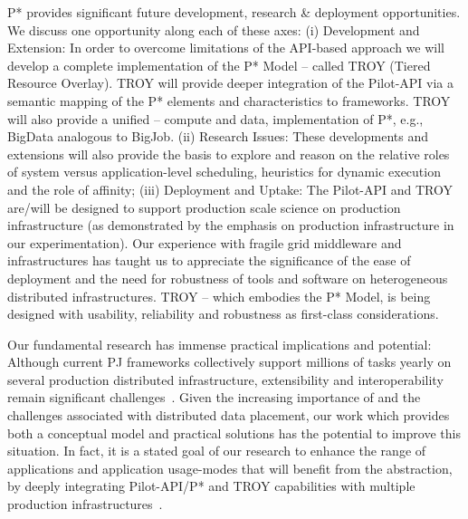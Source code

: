 \documentclass{sig-alternate}
\begin{document}

P* provides significant future development, research \& deployment
opportunities. We discuss one opportunity along each of these axes:
(i) Development and Extension: In order to overcome limitations of the
API-based approach we will develop a complete implementation of the P* Model
-- called TROY (Tiered Resource Overlay). TROY will provide deeper
integration of the Pilot-API via a semantic mapping of the P* elements
and characteristics to \pilotjob frameworks.  TROY will also provide a
unified -- compute and data, implementation of P*, e.g., BigData
analogous to BigJob.  (ii) Research Issues: These developments and
extensions will also provide the basis to explore and reason on the
relative roles of system versus application-level scheduling,
heuristics for dynamic execution and the role of affinity; (iii)
Deployment and Uptake: The Pilot-API and TROY are/will be designed to
support production scale science on production infrastructure (as
demonstrated by the emphasis on production infrastructure in our
experimentation).  Our experience with fragile grid middleware and
infrastructures has taught us to appreciate the significance of the
ease of deployment and the need for robustness of tools and software
on heterogeneous distributed infrastructures.  TROY -- which embodies
the P* Model, is being designed with usability, reliability and
robustness as first-class considerations.

Our fundamental research has immense practical implications and
potential: Although current PJ frameworks collectively support
millions of tasks yearly on several production distributed
infrastructure, extensibility and interoperability remain significant
challenges~\cite{extenci}.  Given the increasing importance of
\pilotjobs and the challenges associated with distributed data
placement, our work which provides both a conceptual model and
practical solutions has the potential to improve this situation.  In
fact, it is a stated goal of our research to enhance the range of
applications and application usage-modes that will benefit from the
\pilot abstraction, by deeply integrating Pilot-API/P* and TROY
capabilities with multiple production
infrastructures~\cite{bigjob-xsede}.
\end{document}
